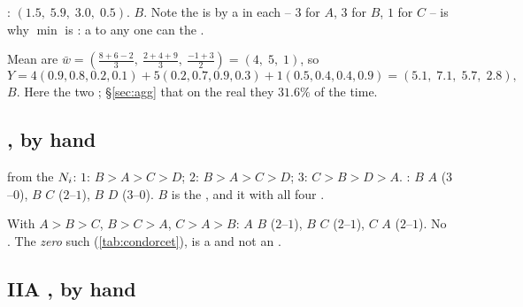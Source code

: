   :
$(1.5,\;5.9,\;3.0,\;0.5)$.  $B$. Note the  is  by a
\emph{}  in each  --  $3$ for $A$,  $3$ for
$B$,  $1$ for $C$ --  is why $\min$ is : a   to
any one  can     the .

 Mean  are
$\bar w = (\tfrac{8+6-2}{3},\ \tfrac{2+4+9}{3},\ \tfrac{-1+3}{2}) = (4,\;5,\;1)$,
so
\[
Y = 4(0.9,0.8,0.2,0.1)+5(0.2,0.7,0.9,0.3)+1(0.5,0.4,0.4,0.9) = (5.1,\;7.1,\;5.7,\;2.8),
\]
 $B$. Here the two  ; §\ref{sec:agg}  that on the real
 they  $31.6\%$ of the time.

\subsection{, by hand}

  from the $N_i$:  $1$: $B\!>\!A\!>\!C\!>\!D$;
 $2$: $B\!>\!A\!>\!C\!>\!D$;  $3$: $C\!>\!B\!>\!D\!>\!A$.
 : $B$  $A$ ($3$--$0$), $B$  $C$ ($2$--$1$),
$B$  $D$ ($3$--$0$). $B$ is the  , and it  with all
four  .

 With 
$A\!>\!B\!>\!C$, $B\!>\!C\!>\!A$, $C\!>\!A\!>\!B$: $A$  $B$ ($2$--$1$), $B$
 $C$ ($2$--$1$), $C$  $A$ ($2$--$1$). No   . The
   \emph{zero} such  (\cref{tab:condorcet}),  is
a    and not an .

\subsection{IIA , by hand}

